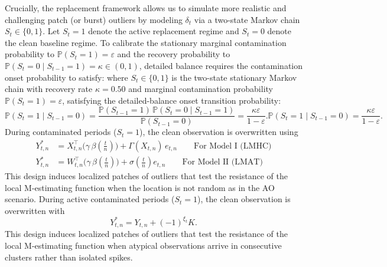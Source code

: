\documentclass[10pt, a4paper]{article}
\theoremstyle{assumption}
\theoremstyle{definition}
\theoremstyle{theorem}
\begin{document}
\begin{enumerate}[label=(\roman*)]
Crucially, the replacement framework allows us to simulate more realistic and challenging patch (or burst) outliers by modeling $\delta_t$ via a two-state Markov chain $S_t \in \{0, 1\}$. Let $S_t = 1$ denote the active replacement regime and $S_t = 0$ denote the clean baseline regime. To calibrate the stationary marginal contamination probability to $\mathbb{P}(S_t = 1) = \varepsilon$ and the recovery probability to $\mathbb{P}(S_t = 0 \mid S_{t-1} = 1) = \kappa \in (0, 1)$, detailed balance requires the contamination onset probability to satisfy:
where $S_t \in \{0, 1\}$ is the two-state stationary Markov chain with recovery rate $\kappa = 0.50$ and marginal contamination probability $\mathbb{P}(S_t = 1) = \varepsilon$, satisfying the detailed-balance onset transition probability:
\begin{equation*}
    \mathbb{P}(S_t = 1 \mid S_{t-1} = 0) = \frac{\mathbb{P}(S_{t-1} = 1) \, \mathbb{P}(S_t = 0 \mid S_{t-1} = 1)}{\mathbb{P}(S_{t-1} = 0)} = \frac{\kappa \varepsilon}{1 - \varepsilon}.
    \mathbb{P}(S_t = 1 \mid S_{t-1} = 0) = \frac{\kappa \varepsilon}{1 - \varepsilon}.
\end{equation*}
During contaminated periods ($S_t = 1$), the clean observation is overwritten using
\begin{align*} 
Y^*_{t,n} &= X_{t,n}^\top \Big(\gamma \, \beta\left(\frac{t}{n}\right)\Big) + \Gamma(X_{t,n}) \, e_{t,n} \qquad \text{For Model I (LMHC)} \\
 Y^*_{t,n} &= W_{t,n}^\top \Big(\gamma \, \beta\left(\frac{t}{n}\right)\Big) + \sigma\left(\frac{t}{n}\right) e_{t,n} \qquad \text{For Model II (LMAT)}
\end{align*}
This design induces localized patches of outliers that test the resistance of the local M-estimating function when the location is not random as in the AO scenario.
During active contaminated periods ($S_t = 1$), the clean observation is overwritten with
\begin{equation*}
    Y^*_{t,n} = Y_{t,n} + (-1)^{\xi_t} K.
\end{equation*}
This design induces localized patches of outliers that test the resistance of the local M-estimating function when atypical observations arrive in consecutive clusters rather than isolated spikes.
\end{enumerate}
\end{document}
